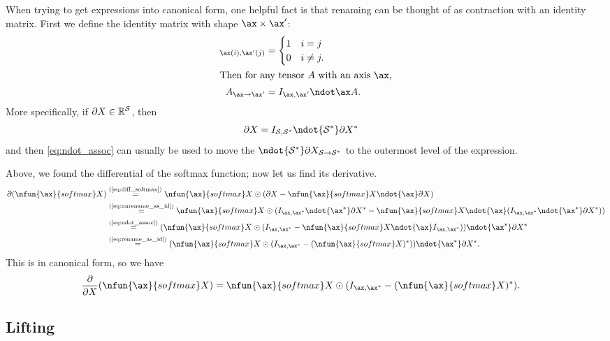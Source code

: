 When trying to get expressions into canonical form, one helpful fact is that
renaming can be thought of as contraction with an identity matrix. First we define the identity matrix with shape $\ax \times \ax'$:
\begin{align}
[I_{\ax,\ax'}]_{\ax(i),\ax'(j)} &= \begin{cases} 1 & i = j \\ 0 & i \neq j. \end{cases} \notag \\
\intertext{Then for any tensor $A$ with an axis $\ax$,}
A_{\ax\rightarrow\ax'} &= I_{\ax,\ax'} \ndot\ax A. 
\label{eq:rename_as_id}
\end{align}
More specifically, if $\partial X \in \mathbb{R}^\mathcal{S}$, then
\begin{align}
\partial X &= I_{\mathcal{S},\mathcal{S}\inax} \ndot{\mathcal{S}\inax} \partial X\inax \label{eq:unrename_as_id}
\end{align}
and then \cref{eq:ndot_assoc} can usually be used to move the ${}\ndot{\mathcal{S}\inax} \partial X_{\mathcal{S}\rightarrow\mathcal{S}\inax}$ to the outermost level of the expression.

Above, we found the differential of the softmax function; now let us find its derivative.
\begin{align*}
\partial (\nfun{\ax}{softmax} X) 
&\eqby{eq:diff_softmax} \nfun{\ax}{softmax} X \odot (\partial X - \nfun{\ax}{softmax} X \ndot{\ax} \partial X) \\
&\eqby{eq:unrename_as_id} \nfun{\ax}{softmax} X \odot (I_{\ax,\ax\inax} \ndot{\ax\inax} \partial X\inax - \nfun{\ax}{softmax} X \ndot{\ax} (I_{\ax,\ax\inax} \ndot{\ax\inax} \partial X\inax)) \\
&\eqby{eq:ndot_assoc} (\nfun{\ax}{softmax} X \odot (I_{\ax,\ax\inax} - \nfun{\ax}{softmax} X \ndot{\ax} I_{\ax,\ax\inax})) \ndot{\ax\inax} \partial X\inax \\
&\eqby{eq:rename_as_id} (\nfun{\ax}{softmax} X \odot (I_{\ax,\ax\inax} - (\nfun{\ax}{softmax} X)\inax)) \ndot{\ax\inax} \partial X\inax.
\end{align*}
This is in canonical form, so we have
\begin{align}
\frac{\partial}{\partial X} (\nfun{\ax}{softmax} X) &= \nfun{\ax}{softmax} X \odot (I_{\ax,\ax\inax} - (\nfun{\ax}{softmax} X)\inax). \label{eq:deriv_softmax}
\end{align}

\subsection{Lifting}

